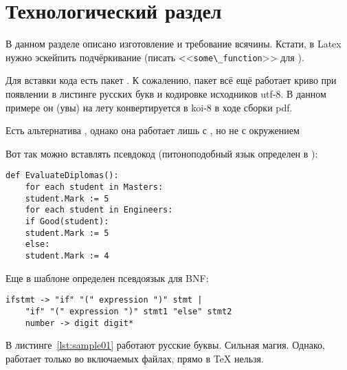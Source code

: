 \chapter{Технологический раздел}
\label{cha:impl}

В данном разделе описано изготовление и требование всячины. Кстати,
в Latex нужно эскейпить подчёркивание (писать <<\verb|some\_function|>> для ).

\ifPDFTeX
Для вставки кода есть пакет . К сожалению, пакет  всё ещё
работает криво при появлении в листинге русских букв и кодировке исходников utf-8.
В данном примере он (увы) на лету конвертируется в koi-8 в ходе сборки pdf.

Есть альтернатива , однако она работает лишь с
, но не с окружением 

Вот так можно вставлять псевдокод (питоноподобный язык определен в ):

\begin{lstlisting}[style=pseudocode,caption={Алгоритм оценки дипломных работ}]
    def EvaluateDiplomas():
    for each student in Masters:
    student.Mark := 5
    for each student in Engineers:
    if Good(student):
    student.Mark := 5
    else:
    student.Mark := 4
\end{lstlisting}

Еще в шаблоне определен псевдоязык для BNF:

\begin{lstlisting}[style=grammar,basicstyle=\small,caption={Грамматика}]
    ifstmt -> "if" "(" expression ")" stmt |
    "if" "(" expression ")" stmt1 "else" stmt2
    number -> digit digit*
\end{lstlisting}

В листинге~\ref{lst:sample01} работают русские буквы. Сильная магия. Однако, работает
только во включаемых файлах, прямо в \TeX{} нельзя.




